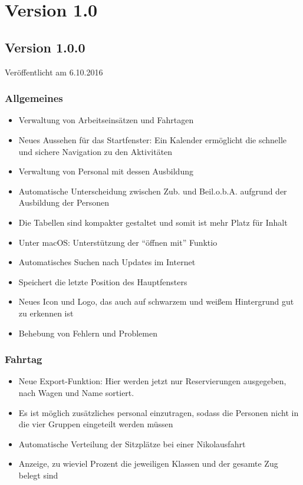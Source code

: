 \section{Version 1.0}\label{versionshistorie:1:0}
\subsection{Version 1.0.0}
\label{version:1:0:0}
Veröffentlicht am 6.10.2016
\subsubsection{Allgemeines}
\begin{itemize}
  \item
  Verwaltung von Arbeitseinsätzen und Fahrtagen
  \item
  Neues Aussehen für das Startfenster: Ein Kalender ermöglicht die schnelle und sichere Navigation zu den Aktivitäten
  \item
  Verwaltung von Personal mit dessen Ausbildung
  \item
  Automatische Unterscheidung zwischen Zub. und Beil.o.b.A. aufgrund der Ausbildung der Personen
  \item
  Die Tabellen sind kompakter gestaltet und somit ist mehr Platz für Inhalt
  \item
  Unter macOS: Unterstützung der "`öffnen mit"' Funktio
  \item
  Automatisches Suchen nach Updates im Internet
  \item
  Speichert die letzte Position des Hauptfensters
  \item
  Neues Icon und Logo, das auch auf schwarzem und weißem Hintergrund gut zu erkennen ist
  \item
  Behebung von Fehlern und Problemen
\end{itemize}

\subsubsection{Fahrtag}
\begin{itemize}
  \item
  Neue Export-Funktion: Hier werden jetzt nur Reservierungen ausgegeben, nach Wagen und Name sortiert.
  \item
  Es ist möglich zusätzliches personal einzutragen, sodass die Personen nicht in die vier Gruppen eingeteilt werden müssen
  \item
  Automatische Verteilung der Sitzplätze bei einer Nikolausfahrt
  \item
  Anzeige, zu wieviel Prozent die jeweiligen Klassen und der gesamte Zug belegt sind
\end{itemize}

